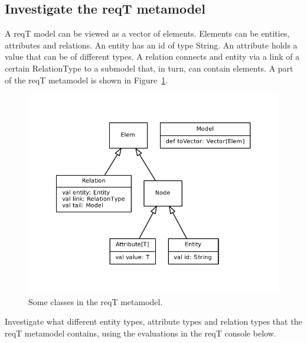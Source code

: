 \documentclass[11pt]{article}
\begin{document}
\subsection{Investigate the reqT metamodel}

A reqT model can be viewed as a vector of elements. Elements can be entities, attributes and relations. An entity has an id of type String. An attribute holds a value that can be of different types. A relation connects and entity via a link of a certain RelationType to a submodel that, in turn, can contain elements. A part of the reqT metamodel is shown in Figure~\ref{fig:metamodel}. 

\begin{figure}[h]
    \centering
    \includegraphics[width=\textwidth]{metamodel-simple.pdf}
    \caption{Some classes in the reqT metamodel.}
    \label{fig:metamodel}
\end{figure}

Investigate what different entity types, attribute types and relation types that the reqT metamodel contains, using the evaluations in the reqT console below. 
\end{document}
